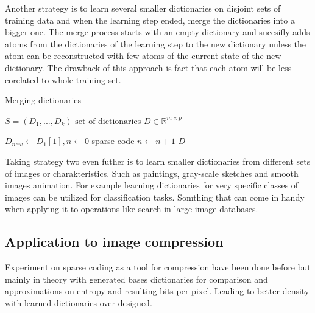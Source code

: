 Another strategy is to learn several smaller dictionaries on disjoint sets of
training data and when the learning step ended, merge the dictionaries
into a bigger one. The merge process starts with an empty dictionary and
sucesifly adds atoms from the dictionaries of the learning step to the
new dictionary unless the atom can be reconstructed with few atoms of the
current state of the new dictionary. The drawback of this approach is fact that 
each atom will be less corelated to whole training set.

\begin{algorithm}[H]
\caption{Merging dictionaries}
\label{alg:merging}
\begin{algorithmic}[1]
\REQUIRE $ S = (D_1,...,D_k) \text{ set of dictionaries } D \in
\mathbb{R}^{m\times p}$

\STATE $D_{new} \gets D_{1}[1], n \gets 0$
\STATE sparse code 
\STATE $n \gets n+1$
\ENDFOR
\ENDFOR
\RETURN $D$
\end{algorithmic}
\end{algorithm}

Taking strategy two even futher is to learn smaller dictionaries from different
sets of images or charakteristics. Such as paintings, gray-scale sketches and
smooth images animation. For example learning dictionaries for very specific
classes of images can be utilized for classification tasks. Somthing that can
come in handy when applying it to operations like search in large image
databases.


\subsection{Application to image compression}
Experiment on sparse coding as a tool for compression have been done
before\cite{Lewicki1999,?} but mainly in theory with generated bases
dictionaries for comparison and approximations on entropy and resulting
bits-per-pixel. Leading to better density with learned dictionaries over
designed. 

